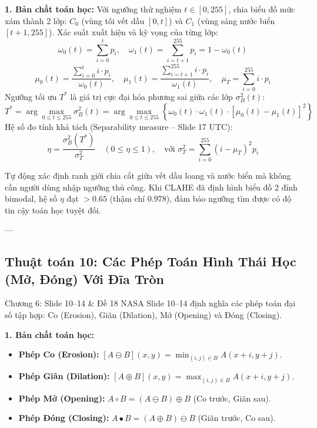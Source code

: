 \documentclass[11pt,a4paper]{article}
\begin{document}
\textbf{1. Bản chất toán học:}
Với ngưỡng thử nghiệm $t \in [0, 255]$, chia biểu đồ mức xám thành 2 lớp: $C_0$ (vùng tối vết dầu $[0, t]$) và $C_1$ (vùng sáng nước biển $[t+1, 255]$).
Xác suất xuất hiện và kỳ vọng của từng lớp:
\begin{equation}
\omega_0(t) = \sum_{i=0}^t p_i, \quad \omega_1(t) = \sum_{i=t+1}^{255} p_i = 1 - \omega_0(t)
\end{equation}
\begin{equation}
\mu_0(t) = \frac{\sum_{i=0}^t i \cdot p_i}{\omega_0(t)}, \quad \mu_1(t) = \frac{\sum_{i=t+1}^{255} i \cdot p_i}{\omega_1(t)}, \quad \mu_T = \sum_{i=0}^{255} i \cdot p_i
\end{equation}
Ngưỡng tối ưu $T^*$ là giá trị cực đại hóa phương sai giữa các lớp $\sigma_B^2(t)$:
\begin{equation}
T^* = \arg\max_{0 \le t \le 255} \sigma_B^2(t) = \arg\max_{0 \le t \le 255} \left\{ \omega_0(t) \cdot \omega_1(t) \cdot \left[ \mu_0(t) - \mu_1(t) \right]^2 \right\}
\end{equation}
Hệ số đo tính khả tách (Separability measure -- Slide 17 UTC):
\begin{equation}
\eta = \frac{\sigma_B^2(T^*)}{\sigma_T^2} \quad (0 \le \eta \le 1), \quad \text{với } \sigma_T^2 = \sum_{i=0}^{255} (i - \mu_T)^2 p_i
\end{equation}

\begin{whyuse}
Tự động xác định ranh giới chia cắt giữa vết dầu loang và nước biển mà không cần người dùng nhập ngưỡng thủ công. Khi CLAHE đã định hình biểu đồ 2 đỉnh bimodal, hệ số $\eta$ đạt $> 0.65$ (thậm chí $0.978$), đảm bảo ngưỡng tìm được có độ tin cậy toán học tuyệt đối.
\end{whyuse}

---

\subsection{Thuật toán 10: Các Phép Toán Hình Thái Học (Mở, Đóng) Với Đĩa Tròn}
\begin{slidemapping}{Chương 6: Slide 10--14 \& Đề 18 NASA}
Slide 10--14 định nghĩa các phép toán đại số tập hợp: Co (Erosion), Giãn (Dilation), Mở (Opening) và Đóng (Closing).
\end{slidemapping}

\textbf{1. Bản chất toán học:}
\begin{itemize}
    \item \textbf{Phép Co (Erosion):} $[A \ominus B](x, y) = \min_{(i, j) \in B} A(x+i, y+j)$.
    \item \textbf{Phép Giãn (Dilation):} $[A \oplus B](x, y) = \max_{(i, j) \in B} A(x+i, y+j)$.
    \item \textbf{Phép Mở (Opening):} $A \circ B = (A \ominus B) \oplus B$ (Co trước, Giãn sau).
    \item \textbf{Phép Đóng (Closing):} $A \bullet B = (A \oplus B) \ominus B$ (Giãn trước, Co sau).
\end{itemize}
\end{document}
